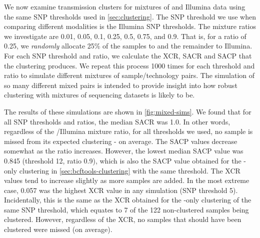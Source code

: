 We now examine transmission clusters for mixtures of \ont{} and Illumina data using the same SNP thresholds used in \autoref{sec:clustering}. The SNP threshold we use when comparing different modalities is the Illumina SNP thresholds. The mixture ratios we investigate are 0.01, 0.05, 0.1, 0.25, 0.5, 0.75, and 0.9. That is, for a ratio of 0.25, we \emph{randomly} allocate 25\% of the samples to \ont{} and the remainder to Illumina. For each SNP threshold and ratio, we calculate the XCR, SACR and SACP that the clustering produces. We repeat this process 1000 times for each threshold and ratio to simulate different mixtures of sample/technology pairs. The simulation of so many different mixed pairs is intended to provide insight into how robust clustering with mixtures of sequencing datasets is likely to be.  

The results of these simulations are shown in \autoref{fig:mixed-sims}. We found that for all SNP thresholds and ratios, the median SACR was 1.0. In other words, regardless of the \ont{}/Illumina mixture ratio, for all thresholds we used, no sample is missed from its expected clustering - on average. The SACP values decrease somewhat as the \ont{}ratio increases. However, the lowest median SACP value was 0.845 (threshold 12, ratio 0.9), which is also the SACP value obtained for the \ont{}-only clustering in \autoref{sec:bcftools-clustering} with the same threshold. The XCR values tend to increase slightly as more \ont{} samples are added. In the most extreme case, 0.057 was the highest XCR value in any simulation (SNP threshold 5). Incidentally, this is the same as the XCR obtained for the \ont{}-only clustering of the same SNP threshold, which equates to 7 of the 122 non-clustered samples being clustered. However, regardless of the XCR, no samples that should have been clustered were missed (on average).

